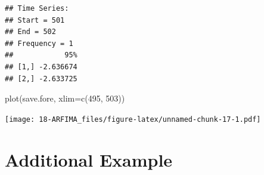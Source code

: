 \documentclass[
]{book}
\newenvironment{Shaded}{\begin{snugshade}}{\end{snugshade}}
\newcommand{\AttributeTok}[1]{\textcolor[rgb]{0.77,0.63,0.00}{#1}}
\newcommand{\DecValTok}[1]{\textcolor[rgb]{0.00,0.00,0.81}{#1}}
\newcommand{\FunctionTok}[1]{\textcolor[rgb]{0.00,0.00,0.00}{#1}}
\newcommand{\NormalTok}[1]{#1}
\theoremstyle{definition}
\theoremstyle{definition}
\theoremstyle{definition}
\theoremstyle{definition}
\theoremstyle{remark}
\begin{document}
\begin{verbatim}
## Time Series:
## Start = 501 
## End = 502 
## Frequency = 1 
##            95%
## [1,] -2.636674
## [2,] -2.633725
\end{verbatim}

\begin{Shaded}
\begin{Highlighting}[]
\FunctionTok{plot}\NormalTok{(save.fore, }\AttributeTok{xlim=}\FunctionTok{c}\NormalTok{(}\DecValTok{495}\NormalTok{, }\DecValTok{503}\NormalTok{))}
\end{Highlighting}
\end{Shaded}

\texttt{[image: 18-ARFIMA\_files/figure-latex/unnamed-chunk-17-1.pdf]}

\hypertarget{additional-example}{%
\section{Additional Example}\label{additional-example}}
\end{document}
